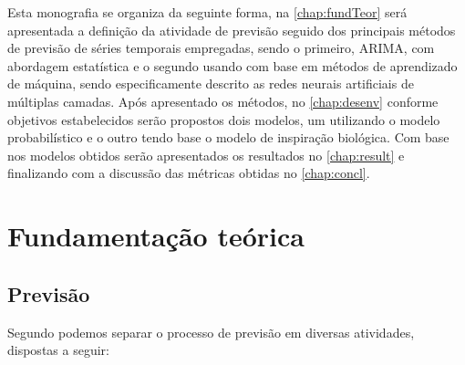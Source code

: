 \documentclass[
    12pt,
    oneside,
    a4paper,
    english,
    brazil
]{abntex2}
\begin{document}
Esta monografia se organiza da seguinte forma, na \autoref{chap:fundTeor} será
apresentada a definição da atividade de previsão seguido dos principais métodos
de previsão de séries temporais empregadas, sendo o primeiro, ARIMA, com
abordagem estatística e o segundo usando com base em métodos de aprendizado de
máquina, sendo especificamente descrito as redes neurais artificiais de
múltiplas camadas. Após apresentado os métodos, no \autoref{chap:desenv}
conforme objetivos estabelecidos serão propostos dois modelos, um utilizando o
modelo probabilístico e o outro tendo base o modelo de inspiração biológica. Com
base nos modelos obtidos serão apresentados os resultados no
\autoref{chap:result} e finalizando com a discussão das métricas obtidas no
\autoref{chap:concl}.

\chapter{Fundamentação teórica}\label{chap:fundTeor}

\section{Previsão}
Segundo  podemos separar o processo de previsão em diversas
atividades, dispostas a seguir:
\end{document}
